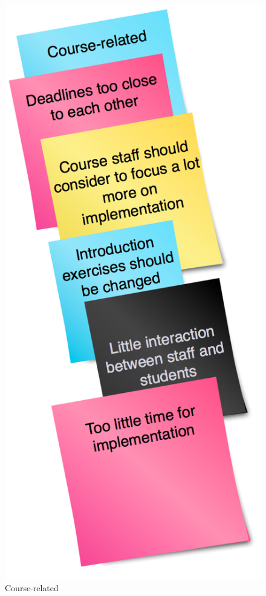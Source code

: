 \documentclass[titlepage,a4paper,11pt]{article}
\begin{document}
\begin{figure}[H]
\begin{minipage}[b]{0.5\linewidth}
        \centering
        \includegraphics[scale=0.4]{graphics/postit/NEG_course_related}
        \caption{Course-related}
        \label{fig:neg2}
    \end{minipage}
\end{figure}
\end{document}
